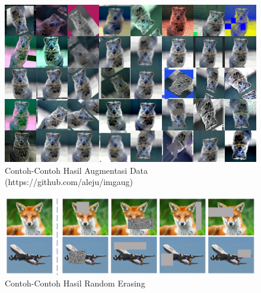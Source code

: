 \begin{figure}[t]
    \centering
    \includegraphics[width=14cm]{gambar/contoh_hasil_imgaug.png}
    \caption[Contoh-Contoh Hasil Augmentasi Data]{Contoh-Contoh Hasil Augmentasi Data (https://github.com/aleju/imgaug)}
    \label{fig:contohhasilimgaug}
\end{figure}

\begin{figure}[t]
    \centering
    \includegraphics[width=14cm]{gambar/contoh_hasil_random_erasing.png}
    \caption[Contoh-Contoh Hasil Random Erasing]{Contoh-Contoh Hasil Random Erasing \protect{}}
    \label{fig:contohrandomerasing}
\end{figure}

